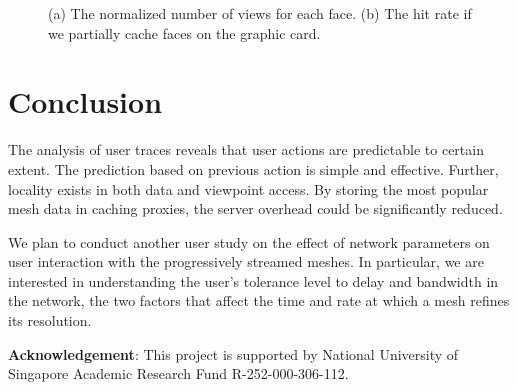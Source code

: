 \begin{figure}[htp!]
\begin{center}
\caption{(a) The normalized number of views for each face. (b) The hit rate if we partially cache faces on the graphic card.\label{fig:heat_map}}
\end{center}
\end{figure}

\section{Conclusion}
The analysis of user traces reveals that 
user actions are predictable to certain extent. The
prediction based on previous action is simple and effective. 
Further, locality exists in both data and viewpoint access. By
storing the most popular mesh data in caching proxies, 
the server overhead could be significantly reduced. 

We plan to conduct another user study on the effect
of network parameters on user interaction with the progressively
streamed meshes. In particular, we are interested in understanding
the user's tolerance level to delay and bandwidth in the network,
the two factors that affect the time and rate at which a mesh 
refines its resolution.

\textbf{Acknowledgement}:
This project is supported by National University of Singapore Academic
Research Fund R-252-000-306-112.
